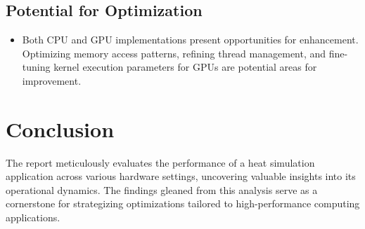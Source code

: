 \hypertarget{potential-for-optimization}{%
\subsection{Potential for
Optimization}\label{potential-for-optimization}}

\begin{itemize}
\tightlist
\item
  Both CPU and GPU implementations present opportunities for
  enhancement. Optimizing memory access patterns, refining thread
  management, and fine-tuning kernel execution parameters for GPUs are
  potential areas for improvement.
\end{itemize}

\hypertarget{conclusion}{%
\section{Conclusion}\label{conclusion}}

The report meticulously evaluates the performance of a heat simulation
application across various hardware settings, uncovering valuable
insights into its operational dynamics. The findings gleaned from this
analysis serve as a cornerstone for strategizing optimizations tailored
to high-performance computing applications.
